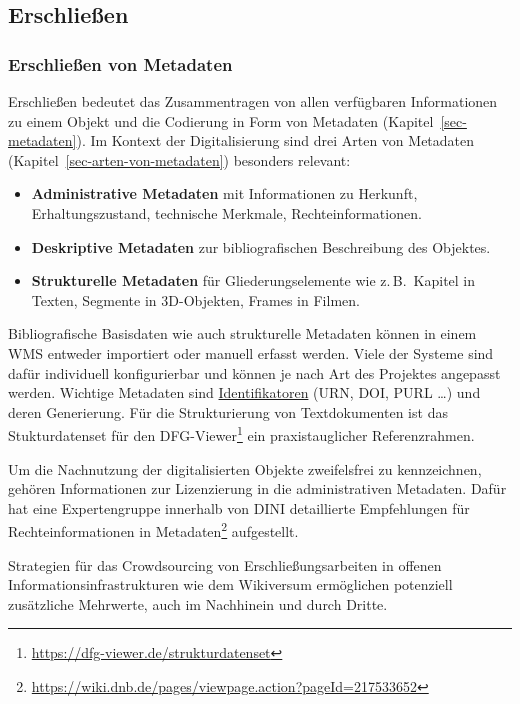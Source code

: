 \documentclass[
  11pt,
  letterpaper,
  DIV=11,
  twoside]{scrreprt}
\DeclareRobustCommand{\href}[2]{#2\footnote{\url{#1}}}
\begin{document}
\subsection{Erschließen}\label{erschlieuxdfen}

\subsubsection{Erschließen von
Metadaten}\label{erschlieuxdfen-von-metadaten}

Erschließen bedeutet das Zusammentragen von allen verfügbaren
Informationen zu einem Objekt und die Codierung in Form von Metadaten
(Kapitel~\ref{sec-metadaten}). Im Kontext der Digitalisierung sind drei
Arten von Metadaten (Kapitel~\ref{sec-arten-von-metadaten}) besonders
relevant:

\begin{itemize}
\item
  \textbf{Administrative Metadaten} mit Informationen zu Herkunft,
  Erhaltungszustand, technische Merkmale, Rechteinformationen.
\item
  \textbf{Deskriptive Metadaten} zur bibliografischen Beschreibung des
  Objektes.
\item
  \textbf{Strukturelle Metadaten} für Gliederungselemente wie
  z.\,B.~Kapitel in Texten, Segmente in 3D-Objekten, Frames in Filmen.
\end{itemize}

Bibliografische Basisdaten wie auch strukturelle Metadaten können in
einem WMS entweder importiert oder manuell erfasst werden. Viele der
Systeme sind dafür individuell konfigurierbar und können je nach Art des
Projektes angepasst werden. Wichtige Metadaten sind
\hyperref[identifikatoren]{Identifikatoren} (URN, DOI, PURL \ldots) und
deren Generierung. Für die Strukturierung von Textdokumenten ist das
\href{https://dfg-viewer.de/strukturdatenset}{Stukturdatenset für den
DFG-Viewer} ein praxistauglicher Referenzrahmen.

Um die Nachnutzung der digitalisierten Objekte zweifelsfrei zu
kennzeichnen, gehören Informationen zur Lizenzierung in die
administrativen Metadaten. Dafür hat eine Expertengruppe innerhalb von
DINI detaillierte
\href{https://wiki.dnb.de/pages/viewpage.action?pageId=217533652}{Empfehlungen
für Rechteinformationen in Metadaten} aufgestellt.

Strategien für das Crowdsourcing von Erschließungsarbeiten in offenen
Informationsinfrastrukturen wie dem Wikiversum ermöglichen potenziell
zusätzliche Mehrwerte, auch im Nachhinein und durch Dritte.
\end{document}

